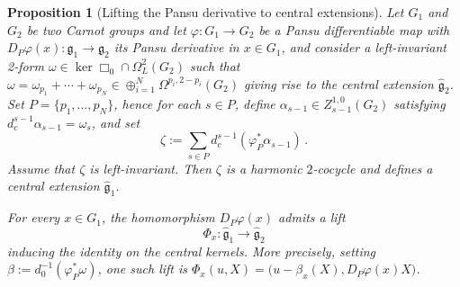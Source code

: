 \documentclass[dvipsnames]{amsart}
\newtheorem{proposition}[theorem]{Proposition}
\theoremstyle{definition}
\theoremstyle{definition}
\numberwithin{equation}{section}
\begin{document}
\begin{proposition}[Lifting the Pansu derivative to central extensions]\label{prop: extensions}
Let $G_1$ and $G_2$ be two Carnot groups and let $\varphi\colon G_1\to G_2$ be a Pansu differentiable map with $D_P\varphi(x)\colon\mathfrak{g}_1\to\mathfrak{g}_2$ its Pansu derivative in $x \in G_1$, and consider a left-invariant 2-form $\omega\in\ker\Box_0\cap\Omega^2_L(G_2)$ such that $\omega=\omega_{p_1}+\cdots+\omega_{p_N}\in\oplus_{i=1}^N\Omega^{p_i,2-p_i}(G_2)$ giving rise to the central extension $\hat{\mathfrak{g}}_2$.
Set $P=\{p_1,\ldots,p_N\}$, hence for each $s\in P$, define
$\alpha_{s-1}\in Z_{s-1}^{1,0}(G_2)$ satisfying
$d_c^{s-1}\alpha_{s-1}=\omega_s$, and set
$$\zeta:=
    \sum_{s\in P}
    d_c^{s-1}(\varphi_P^*\alpha_{s-1})\,.$$
Assume that $\zeta$ is left-invariant.
Then $\zeta$ is a harmonic $2$-cocycle and defines
a central extension $\hat{\mathfrak g}_1$.

For every $x\in G_1$, the homomorphism $D_P\varphi(x)$
admits a lift
$$\Phi_x:\hat{\mathfrak g}_1\to\hat{\mathfrak g}_2$$
inducing the identity on the central kernels.
More precisely, setting $\beta:=d_0^{-1}(\varphi_P^*\omega)$,
one such lift is $
    \Phi_x(u,X)
    =
    \bigl(u-\beta_x(X),D_P\varphi(x)X\bigr)$.

    
\end{proposition}
\end{document}
